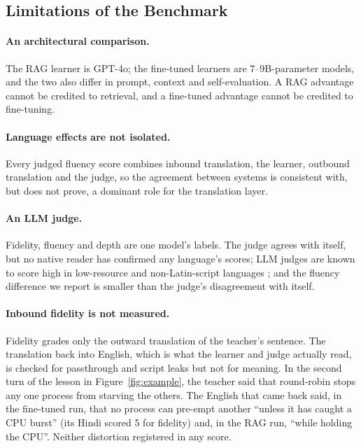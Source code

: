 \documentclass[pdflatex,sn-mathphys-num]{sn-jnl}%
\theoremstyle{thmstyleone}%
\theoremstyle{thmstyletwo}%
\theoremstyle{thmstylethree}%
\begin{document}
\subsection{Limitations of the Benchmark}\label{sec:lim-benchmark}

\paragraph{An architectural comparison.} The RAG learner is GPT-4o; the fine-tuned learners are
7--9B-parameter models, and the two also differ in prompt, context and self-evaluation. A RAG
advantage cannot be credited to retrieval, and a fine-tuned advantage cannot be credited to
fine-tuning.

\paragraph{Language effects are not isolated.} Every judged fluency score combines inbound
translation, the learner, outbound translation and the judge, so the agreement between systems is
consistent with, but does not prove, a dominant role for the translation layer.

\paragraph{An LLM judge.} Fidelity, fluency and depth are one model's labels. The judge agrees with
itself, but no native reader has confirmed any language's scores; LLM judges are known to score high
in low-resource and non-Latin-script languages \cite{hada2024multilingual}; and the fluency difference
we report is smaller than the judge's disagreement with itself.

\paragraph{Inbound fidelity is not measured.} Fidelity grades only the outward translation of the
teacher's sentence. The translation back into English, which is what the learner and judge
actually read, is checked for passthrough and script leaks but not for meaning. In the second turn
of the lesson in Figure~\ref{fig:example}, the teacher said that round-robin stops any one process
from starving the others. The English that came back said, in the fine-tuned run, that no process can
pre-empt another ``unless it has caught a CPU burst'' (its Hindi scored 5 for fidelity) and, in the
RAG run, ``while holding the CPU''. Neither distortion registered in any score.
\end{document}
